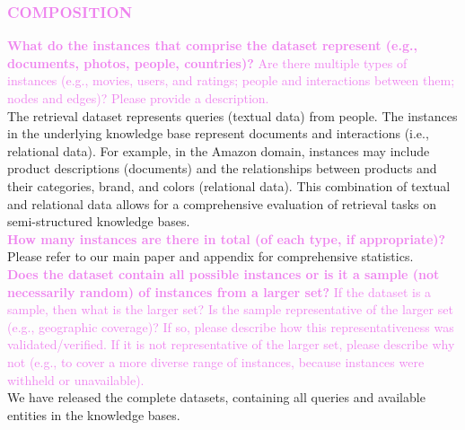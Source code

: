 \documentclass{article}
\newcommand{\sectioncolor}{Violet}
\begin{document}
\begin{mdframed}[linecolor=\sectioncolor]
\subsubsection*{\textcolor{\sectioncolor}{
    COMPOSITION
}}
\end{mdframed}
    \textcolor{\sectioncolor}{\textbf{
    What do the instances that comprise the dataset represent (e.g., documents,
    photos, people, countries)?
    }
    Are there multiple types of instances (e.g., movies, users, and ratings;
    people and interactions between them; nodes and edges)? Please provide a
    description.
    } \\
    The retrieval dataset represents queries (textual data) from people. The instances in the underlying knowledge base represent documents and interactions (i.e., relational data). For example, in the Amazon domain, instances may include product descriptions (documents) and the relationships between products and their categories, brand, and colors (relational data). This combination of textual and relational data allows for a comprehensive evaluation of retrieval tasks on semi-structured knowledge bases.\\
    
    \textcolor{\sectioncolor}{\textbf{
    How many instances are there in total (of each type, if appropriate)?
    }
    } \\
   Please refer to our main paper and appendix for comprehensive statistics. \\
    
    \textcolor{\sectioncolor}{\textbf{
    Does the dataset contain all possible instances or is it a sample (not
    necessarily random) of instances from a larger set?
    }
    If the dataset is a sample, then what is the larger set? Is the sample
    representative of the larger set (e.g., geographic coverage)? If so, please
    describe how this representativeness was validated/verified. If it is not
    representative of the larger set, please describe why not (e.g., to cover a
    more diverse range of instances, because instances were withheld or
    unavailable).
    } \\
    We have released the complete datasets, containing all queries and available entities in the knowledge bases. \\
    
\end{document}

